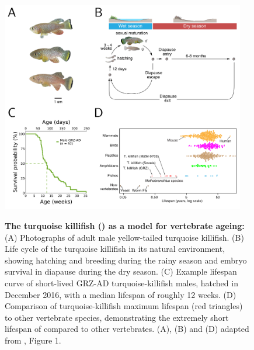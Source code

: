 \begin{figure}
\centering
\includegraphics[width=0.95\textwidth]{_Figures/png_edited/intro-turquoise-killifish}
\begin{subfigure}{0em}
\label{fig:intro-killifish-photos}
\end{subfigure}
\begin{subfigure}{0em}
\label{fig:intro-killifish-life-cycle}
\end{subfigure}
\begin{subfigure}{0em}
\label{fig:intro-killifish-lifespan}
\end{subfigure}
\begin{subfigure}{0em}
\label{fig:intro-killifish-comparison}
\end{subfigure}
\caption[The turquoise killifish (\nfu) as a model for vertebrate ageing]{\textbf{The turquoise killifish (\nfu) as a model for vertebrate ageing:} (A) Photographs of adult male yellow-tailed turquoise killifish.
(B) Life cycle of the turquoise killifish in its natural environment, showing hatching and breeding during the rainy season and embryo survival in diapause during the dry season.
(C) Example lifespan curve of short-lived GRZ-AD turquoise-killifish males, hatched in December 2016, with a median lifespan of roughly 12 weeks.
(D) Comparison of turquoise-killifish maximum lifespan (red triangles) to other vertebrate species, demonstrating the extremely short lifespan of \Nfu compared to other vertebrates. (A), (B) and (D) adapted from \parencite{valenzano2015genome}, Figure 1.}
\label{fig:intro-killifish}
\end{figure}